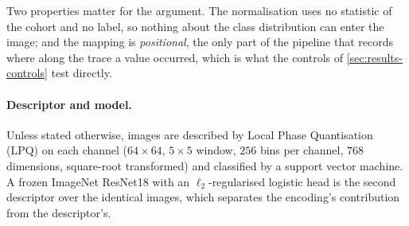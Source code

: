 Two properties matter for the argument. The normalisation uses no statistic of the cohort and no
label, so nothing about the class distribution can enter the image; and the mapping is
\emph{positional}, the only part of the pipeline that records where along the trace a value
occurred, which is what the controls of \cref{sec:results-controls} test directly.

\paragraph{Descriptor and model.} Unless stated otherwise, images are described by Local Phase
Quantisation (LPQ) \citep{ojansivu2008lpq} on each channel ($64 \times 64$, $5\times 5$ window,
$256$ bins per channel, $768$ dimensions, square-root transformed) and classified by a support
vector machine. A frozen ImageNet ResNet18 \citep{he2016resnet} with an $\ell_2$-regularised
logistic head is the second descriptor over the identical images, which separates the encoding's
contribution from the descriptor's.

